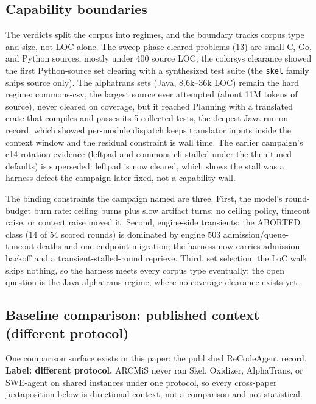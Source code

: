 \documentclass[11pt]{article}
\begin{document}
\subsection{Capability boundaries}

The verdicts split the corpus into regimes, and the boundary tracks
corpus type and size, not LOC alone. The sweep-phase cleared problems
(13) are small C, Go, and Python sources, mostly under 400 source LOC;
the colorsys clearance showed the first Python-source set clearing with
a synthesized test suite (the \texttt{skel} family ships source only).
The alphatrans sets (Java, 8.6k--36k LOC) remain the hard regime:
commons-csv, the largest source ever attempted (about 11M tokens of
source), never cleared on coverage, but it reached \textsf{Planning}
with a translated crate that compiles and passes its 5 collected tests,
the deepest Java run on record, which showed per-module dispatch
keeps translator inputs inside the context window and the residual
constraint is wall time. The earlier campaign's c14 rotation evidence
(leftpad and commons-cli stalled under the then-tuned defaults) is
superseded: leftpad is now cleared, which shows the stall was a harness
defect the campaign later fixed, not a capability wall.

The binding constraints the campaign named are three. First, the
model's round-budget burn rate: ceiling burns plus slow artifact turns;
no ceiling policy, timeout raise, or context raise moved it. Second,
engine-side transients: the ABORTED class (14 of 54 scored rounds) is dominated
by engine 503 admission/queue-timeout deaths and one endpoint
migration; the harness now carries admission backoff and a
transient-stalled-round reprieve. Third, set selection: the LoC walk
skips nothing, so the harness meets every corpus type eventually; the
open question is the Java alphatrans regime, where no coverage
clearance exists yet.

\subsection{Baseline comparison: published context (different protocol)}
\label{sec:baseline}

One comparison surface exists in this paper: the published ReCodeAgent
record. \textbf{Label: different protocol.} ARCMiS never ran Skel,
Oxidizer, AlphaTrans, or SWE-agent on shared instances under one
protocol, so every cross-paper juxtaposition below is directional
context, not a comparison and not statistical.
\end{document}
